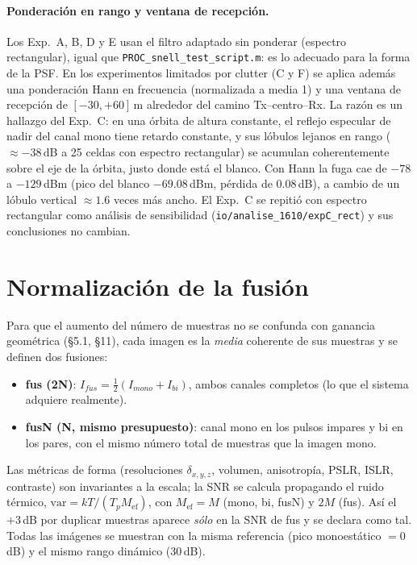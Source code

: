 \paragraph{Ponderación en rango y ventana de recepción.}\label{sec:ponderacion} Los Exp.~A, B, D y E
usan el filtro adaptado sin ponderar (espectro rectangular), igual que
\texttt{PROC\_snell\_test\_script.m}: es lo adecuado para la forma de la PSF.
En los experimentos limitados por clutter (C y F) se aplica además una
ponderación Hann en frecuencia (normalizada a media 1) y una ventana de
recepción de $[-30,+60]$\,m alrededor del camino Tx--centro--Rx. La razón es
un hallazgo del Exp.~C: en una órbita de altura constante, el reflejo
especular de nadir del canal mono tiene retardo constante, y sus lóbulos
lejanos en rango ($\approx-38$\,dB a 25 celdas con espectro rectangular) se
acumulan coherentemente sobre el eje de la órbita, justo donde está el blanco.
Con Hann la fuga cae de $-78$ a $-129$\,dBm (pico del blanco $-69.08$\,dBm,
pérdida de 0.08\,dB), a cambio de un lóbulo vertical $\approx1.6$ veces más
ancho. El Exp.~C se repitió con espectro rectangular como análisis de
sensibilidad (\texttt{io/analise\_1610/expC\_rect}) y sus conclusiones no cambian.

\section{Normalización de la fusión}
\label{sec:normalizacion}

Para que el aumento del número de muestras no se confunda con ganancia
geométrica (§5.1, §11), cada imagen es la \emph{media} coherente de sus muestras y
se definen dos fusiones:
\begin{itemize}[itemsep=2pt]
  \item \textbf{fus (2N)}: $I_{fus}=\tfrac12(I_{mono}+I_{bi})$, ambos canales completos
  (lo que el sistema adquiere realmente).
  \item \textbf{fusN (N, mismo presupuesto)}: canal mono en los pulsos impares y
  bi en los pares, con el mismo número total de muestras que la imagen mono.
\end{itemize}
Las métricas de forma (resoluciones $\delta_{x,y,z}$, volumen, anisotropía, PSLR, ISLR, contraste) son
invariantes a la escala; la SNR se calcula propagando el ruido térmico,
$\mathrm{var}=kT/(T_pM_{\mathrm{ef}})$, con $M_{\mathrm{ef}}=M$ (mono, bi, fusN)
y $2M$ (fus). Así el $+3$\,dB por duplicar muestras aparece \emph{sólo} en la
SNR de fus y se declara como tal. Todas las imágenes se muestran con la misma
referencia (pico monoestático $=0$\,dB) y el mismo rango dinámico (30\,dB).

